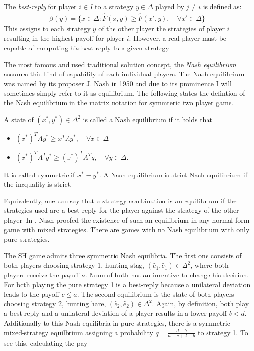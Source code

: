 \documentclass[11pt]{article}
\begin{document}
The \textit{best-reply} for player $i \in I$ to a strategy $y \in \Delta$ 
played by $j \neq i$ is defined as:
\begin{align}
        \beta(y) = \{x \in \Delta: \hat{F}(x,y) \geq \hat{F}(x',y), 
        \quad \forall x' \in \Delta\}
\end{align}
This assigns to each strategy $y$ of the other player the strategies
of player $i$ resulting in the highest payoff for player $i$. However, a 
real player must be capable of computing his best-reply to a given strategy.

The most famous and used traditional solution concept, the \textit{Nash 
equilibrium} assumes this kind of capability of each individual players. 
The Nash equilibrium was named by its proposer J. Nash in 1950 
and due to its prominence I will sometimes simply refer to it as equilibrium.
The following states the defintion of the Nash equilibrium in the matrix
notation for symmteric two player game.
\begin{mydef}
        \label{def:nashequilibrium}
        A state of $(x^*,y^*) \in \Delta^2$ is called a Nash equilibrium if 
        it holds that
\begin{itemize}
        \item   $(x^*)^T A y^* \geq x^T A y^*, \quad \forall x \in \Delta$
        \item   $(x^*)^T A^T y^* \geq (x^*)^T A^T y, \quad \forall y \in \Delta$.
\end{itemize}
It is called symmetric if $x^* = y^*$. A Nash equilibrium is 
strict Nash equilibrium if the inequality is strict.
\end{mydef}
Equivalently, one can say that a strategy combination is an equilibrium if
the strategies used are a best-reply for the player against the strategy
of the other player.
In \textcite{nash_equilibrium_1950}, Nash proofed the existence of such 
an equilibrium in any normal form game with mixed strategies. There are
games with no Nash equilibrium with only pure strategies.

The SH game admits three symmetric Nash equilibria. The first one consists
of both players choosing strategy 1, hunting stag, $(\hat{e}_1,\hat{e}_1) \in
\Delta^2$, where both players receive the payoff $a$. 
None of both has an incentive to change his decision. For both
playing the pure strategy 1 is a best-reply because a unilateral deviation 
leads to the payoff $c \leq a$.
The second equilibrium is the state of 
both players choosing strategy 2, hunting hare, $(\hat{e}_2,\hat{e}_2)
\in \Delta^2$. Again, by definition, both play a best-reply and a unilateral 
deviation of a player results in a lower payoff $b<d$.
Additionally to this Nash equilibria in pure strategies, there is a symmetric
mixed-strategy equilbrium assigning a probability $q=\frac{d-b}{a-c+d-b}$ to
strategy 1. To see this, calculating the pay 
\end{document}
